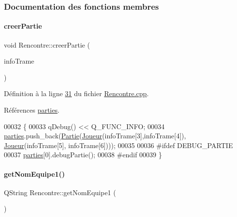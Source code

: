 \subsubsection{Documentation des fonctions membres}
\mbox{\label{class_rencontre_a8eb8eb61ed543925626e7680a1ecef5b}} 
\paragraph{\texorpdfstring{creer\+Partie}{creerPartie}}
{\footnotesize\ttfamily void Rencontre\+::creer\+Partie (\begin{DoxyParamCaption}\item[{Q\+String\+List}]{info\+Trame }\end{DoxyParamCaption})\hspace{0.3cm}{\ttfamily [slot]}}



Définition à la ligne \hyperlink{_rencontre_8cpp_source_l00031}{31} du fichier \hyperlink{_rencontre_8cpp_source}{Rencontre.\+cpp}.



Références \hyperlink{_rencontre_8h_source_l00031}{parties}.


\begin{DoxyCode}
00032 \{
00033     qDebug() << Q\_FUNC\_INFO;
00034     \hyperlink{class_rencontre_a6b52ccf9b5d083718928b207ae5316fe}{parties}.push\_back(\hyperlink{class_partie}{Partie}(\hyperlink{class_joueur}{Joueur}(infoTrame[3],infoTrame[4]), 
      \hyperlink{class_joueur}{Joueur}(infoTrame[5], infoTrame[6])));
00035 
00036 \textcolor{preprocessor}{    #ifdef DEBUG\_PARTIE}
00037     \hyperlink{class_rencontre_a6b52ccf9b5d083718928b207ae5316fe}{parties}[0].debugPartie();
00038 \textcolor{preprocessor}{    #endif}
00039 \}
\end{DoxyCode}
\mbox{\label{class_rencontre_a50df24caf57437d8eaaadae43ff846ec}} 
\paragraph{\texorpdfstring{get\+Nom\+Equipe1()}{getNomEquipe1()}}
{\footnotesize\ttfamily Q\+String Rencontre\+::get\+Nom\+Equipe1 (\begin{DoxyParamCaption}{ }\end{DoxyParamCaption})}



